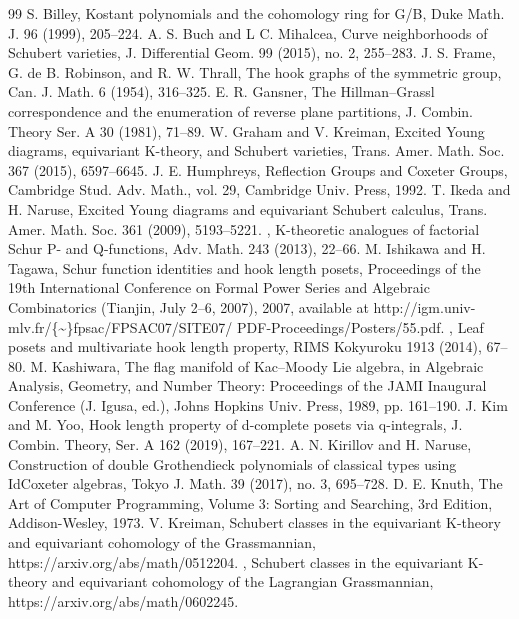 \begin{thebibliography}{99}
 S. Billey, Kostant polynomials and the cohomology ring for G/B, Duke Math. J. 96 (1999), 205–224.
 A. S. Buch and L C. Mihalcea, Curve neighborhoods of Schubert varieties, J. Differential Geom. 99 (2015), no. 2, 255–283.
 J. S. Frame, G. de B. Robinson, and R. W. Thrall, The hook graphs of the symmetric group, Can. J. Math. 6 (1954), 316–325.
 E. R. Gansner, The Hillman–Grassl correspondence and the enumeration of reverse plane partitions, J. Combin. Theory Ser. A 30 (1981), 71–89.
 W. Graham and V. Kreiman, Excited Young diagrams, equivariant K-theory, and Schubert varieties, Trans. Amer. Math. Soc. 367 (2015), 6597–6645.
 J. E. Humphreys, Reflection Groups and Coxeter Groups, Cambridge Stud. Adv. Math., vol. 29, Cambridge Univ. Press, 1992.
 T. Ikeda and H. Naruse, Excited Young diagrams and equivariant Schubert calculus, Trans. Amer. Math. Soc. 361 (2009), 5193–5221.
 , K-theoretic analogues of factorial Schur P- and Q-functions, Adv. Math. 243 (2013), 22–66.
 M. Ishikawa and H. Tagawa, Schur function identities and hook length posets, Proceedings of the 19th International Conference on Formal Power Series and Algebraic Combinatorics (Tianjin, July 2–6, 2007), 2007, available at http://igm.univ-mlv.fr/\{\textasciitilde{}\}fpsac/FPSAC07/SITE07/ PDF-Proceedings/Posters/55.pdf.
 , Leaf posets and multivariate hook length property, RIMS Kokyuroku 1913 (2014), 67– 80.
 M. Kashiwara, The flag manifold of Kac–Moody Lie algebra, in Algebraic Analysis, Geometry, and Number Theory: Proceedings of the JAMI Inaugural Conference (J. Igusa, ed.), Johns Hopkins Univ. Press, 1989, pp. 161–190.
 J. Kim and M. Yoo, Hook length property of d-complete posets via q-integrals, J. Combin. Theory, Ser. A 162 (2019), 167–221.
 A. N. Kirillov and H. Naruse, Construction of double Grothendieck polynomials of classical types using IdCoxeter algebras, Tokyo J. Math. 39 (2017), no. 3, 695–728.
 D. E. Knuth, The Art of Computer Programming, Volume 3: Sorting and Searching, 3rd Edition, Addison-Wesley, 1973.
 V. Kreiman, Schubert classes in the equivariant K-theory and equivariant cohomology of the Grassmannian, https://arxiv.org/abs/math/0512204.
 , Schubert classes in the equivariant K-theory and equivariant cohomology of the Lagrangian Grassmannian, https://arxiv.org/abs/math/0602245.

\end{thebibliography}
